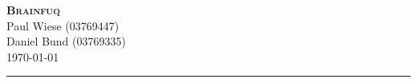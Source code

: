\documentclass[10pt,a4paper]{article}
\newcommand{\HRule}{\rule{\linewidth}{0.3mm}}
\begin{document}
\begin{center}
    {\Large \textbf{\textsc{Brainfuq}}}\\[0.5cm]
    {\normalsize Paul Wiese (03769447)}\\
    {\normalsize Daniel Bund (03769335)}\\
    {\normalsize \today}\\[0.5cm]
    \HRule \\
\end{center}









\printbibliography
\end{document}
